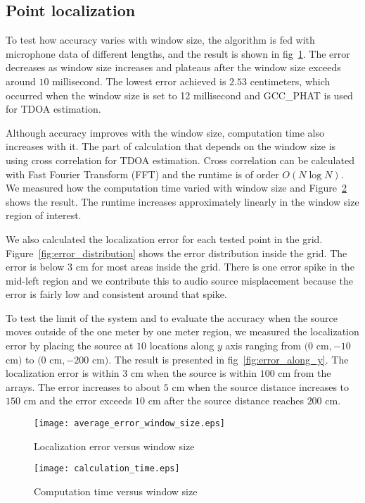 \subsection{Point localization}
To test how accuracy varies with window size, the algorithm is fed with microphone data of different lengths, and the result is shown in fig~\ref{fig:accuracy_vs_window}. The error decreases as window size increases and plateaus after the window size exceeds around $10$ millisecond. The lowest error achieved is $2.53$ centimeters, which occurred when the window size is set to 12 millisecond and GCC\_PHAT is used for TDOA estimation.

Although accuracy improves with the window size, computation time also increases with it. The part of calculation that depends on the window size is using cross correlation for TDOA estimation. Cross correlation can be calculated with Fast Fourier Transform (FFT) and the runtime is of order $O(N\log N)$. We measured how the computation time varied with window size and Figure~\ref{fig:speed_vs_window} shows the result. The runtime increases approximately linearly in the window size region of interest.

We also calculated the localization error for each tested point in the grid. Figure~\ref{fig:error_distribution} shows the error distribution inside the grid. The error is below $3$ cm for most areas inside the grid. There is one error spike in the mid-left region and we contribute this to audio source misplacement because the error is fairly low and consistent around that spike.

To test the limit of the system and to evaluate the accuracy when the source moves outside of the one meter by one meter region, we measured the localization error by placing the source at $10$ locations along $y$ axis ranging from $(0$ cm$, -10$ cm$)$ to $(0$ cm$, -200$ cm$)$. The result is presented in fig~\ref{fig:error_along_y}. The localization error is within $3$ cm when the source is within $100$ cm from the arrays. The error increases to about $5$ cm when the source distance increases to $150$ cm and the error exceeds $10$ cm after the source distance reaches $200$ cm.

\begin{figure}[]
\centering
\texttt{[image: average\_error\_window\_size.eps]}
\caption{Localization error versus window size}
\label{fig:accuracy_vs_window}
\end{figure}

\begin{figure}[]
\centering
\texttt{[image: calculation\_time.eps]}
\caption{Computation time versus window size}
\label{fig:speed_vs_window}
\end{figure}


